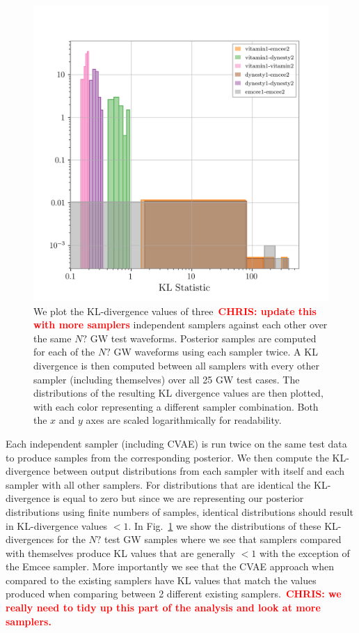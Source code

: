 \documentclass[%
showpacs,
 amsmath,amssymb,
 aps,
 twocolumn,
 prl,
 reprint,
floatfix,
]{revtex4-1}
\newcommand{\chris}[1]{\textbf{\textcolor{red}{CHRIS: #1}}}
\begin{document}
%
%
\begin{figure}
    \includegraphics[width=\columnwidth]{images/hist-kl.png}
    \caption{\label{fig:kl_results} We plot the KL-divergence values of
three~\chris{update this with more samplers} independent samplers against each
other over the same $N?$ \ac{GW} test waveforms. Posterior samples are computed
for each of the $N?$ \ac{GW} waveforms using each sampler twice. A KL
divergence is then computed between all samplers with every other sampler
(including themselves) over all 25 \ac{GW} test cases. The distributions of the
resulting KL divergence values are then plotted, with each color representing a
different sampler combination. Both the $x$ and $y$ axes are scaled
logarithmically for readability.} 
\end{figure}
%

%
%
Each independent sampler (including \ac{CVAE}) is run twice on the same test
data to produce samples from the corresponding posterior. We then compute the
KL-divergence between output distributions from each sampler with itself and
each sampler with all other samplers. For distributions that are identical the
KL-divergence is equal to zero but since we are representing our posterior
distributions using finite numbers of samples, identical distributions should
result in KL-divergence values $<1$. In Fig.~\ref{fig:kl_results} we show the
distributions of these KL-divergences for the $N?$ test \ac{GW} samples where
we see that samplers compared with themselves produce KL values that are
generally $<1$ with the exception of the Emcee sampler. More importantly we see
that the \ac{CVAE} approach when compared to the existing samplers have KL
values that match the values produced when comparing between 2 different
existing samplers.~\chris{we really need to tidy up this part of the analysis
and look at more samplers.} 
\end{document}
